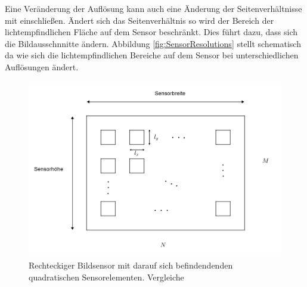 Eine Veränderung der Auflösung kann auch eine Änderung der Seitenverhältnisse mit einschließen. Ändert sich das Seitenverhältnis so wird der Bereich der lichtempfindlichen Fläche auf dem Sensor beschränkt\cite{Photonik}. Dies führt dazu, dass sich die Bildausschnnitte ändern. Abbildung \ref{fig:SensorResolutions} stellt schematisch da wie sich die lichtempfindlichen Bereiche auf dem Sensor bei unterschiedlichen Auflösungen ändert.




\begin{figure}[!htb]
	\centering
	\includegraphics[width=.7\linewidth]{images/Bildsensor_mit_Pixel.png}
	\caption[Aufbau CMOS Sensor]{Rechteckiger Bildsensor mit darauf sich befindendenden quadratischen Sensorelementen. Vergleiche \cite{Photonik}} 
	\label{fig:Sensor}
\end{figure}


%




